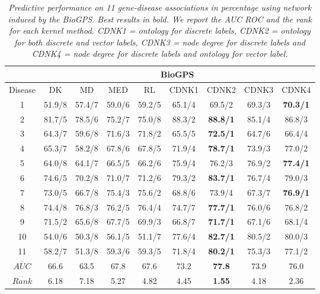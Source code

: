 \documentclass[review]{elsarticle}
\begin{document}
\begin{table}
\caption{\textit {Predictive performance on 11 gene-disease associations in percentage using network induced by the BioGPS. Best results in bold. We report the AUC ROC and the rank for each kernel method.  CDNK1 = ontology for discrete labels, CDNK2 = ontology for both discrete and vector labels, CDNK3 = node degree for discrete labels and CDNK4 = node degree for discrete labels and ontology for vector label.}}
\vspace*{5pt}
\centering
\setlength{\tabcolsep}{1mm}
\begin{tabular}{|c|c|c|c|c|c|c|c|c|}
\hline
         & \multicolumn{8}{c|}{\textbf{BioGPS}}\\
 \hline
Disease & DK & MD & MED & RL & CDNK1 & CDNK2 & CDNK3 & CDNK4\\

 \hline
1 & 51.9/8 & 57.4/7 & 59.0/6 & 59.2/5 & 65.1/4 & 69.5/2 & 69.3/3 & \textbf{70.3/1} \\
2 & 81.7/5 & 78.5/6 & 75.2/7 & 75.0/8 & 88.3/2 & \textbf{88.8/1} & 85.1/4 & 86.8/3 \\
3 & 64.3/7 & 59.6/8 & 71.6/3 & 71.8/2 & 65.5/5 & \textbf{72.5/1} & 64.7/6 & 66.4/4 \\
4 & 65.3/7 & 58.2/8 & 67.8/6 & 67.8/5 & 71.9/4 & \textbf{78.7/1} & 73.9/3 & 77.0/2 \\
5 & 64.0/8 & 64.1/7 & 66.5/5 & 66.2/6 & 75.9/4 & 76.2/3 & 76.9/2 & \textbf{77.4/1} \\
6 & 74.6/5 & 70.2/8 & 71.0/7 & 71.2/6 & 79.3/2 & \textbf{83.7/1} & 76.7/4 & 79.0/3 \\
7 & 73.0/5 & 66.7/8 & 75.4/3 & 75.6/2 & 68.8/6 & 73.9/4 & 67.3/7 & \textbf{76.9/1} \\
8 & 74.4/8 & 76.8/3 & 76.2/5 & 76.4/4 & 74.7/7 & \textbf{77.7/1} & 76.0/6 & 76.8/2 \\
9 & 71.5/2 & 65.6/8 & 67.7/5 & 69.9/3 & 66.8/7 & \textbf{71.7/1} & 67.1/6 & 68.1/4 \\
10 & 54.0/6 & 50.3/8 & 56.1/5 & 51.1/7 & 77.6/4 & \textbf{82.7/1} & 80.5/2 & 80.0/3 \\
11 & 58.2/7 & 51.3/8 & 59.3/6 & 59.3/5 & 71.8/4 & \textbf{80.2/1} & 75.3/3 & 77.1/2 \\
\hline
$\overline{AUC}$ & 66.6 & 63.5 & 67.8 & 67.6 & 73.2 & \textbf{77.8} & 73.9 & 76.0 \\
$\overline{Rank}$ & 	6.18 & 7.18 & 5.27 & 4.82 & 4.45 & \textbf{1.55} & 4.18 & 2.36 \\
 \hline 
\end{tabular}
\label{table_biogps}
\end{table}
\end{document}
